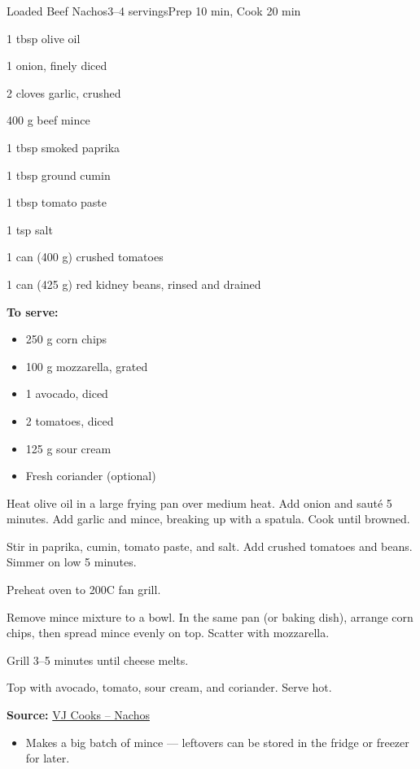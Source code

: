\newpage
\begin{recipebox}{Loaded Beef Nachos}{3--4 servings}{Prep 10 min, Cook 20 min}
\begin{ingredients}
  \item 1 tbsp olive oil
  \item 1 onion, finely diced
  \item 2 cloves garlic, crushed
  \item 400 g beef mince
  \item 1 tbsp smoked paprika
  \item 1 tbsp ground cumin
  \item 1 tbsp tomato paste
  \item 1 tsp salt
  \item 1 can (400 g) crushed tomatoes
  \item 1 can (425 g) red kidney beans, rinsed and drained
  \item \textbf{To serve:}
  \begin{itemize}
    \item 250 g corn chips
    \item 100 g mozzarella, grated
    \item 1 avocado, diced
    \item 2 tomatoes, diced
    \item 125 g sour cream
    \item Fresh coriander (optional)
  \end{itemize}
\end{ingredients}

\begin{method}
  \item Heat olive oil in a large frying pan over medium heat. Add onion and sauté 5 minutes. Add garlic and mince, breaking up with a spatula. Cook until browned.
  \item Stir in paprika, cumin, tomato paste, and salt. Add crushed tomatoes and beans. Simmer on low 5 minutes.
  \item Preheat oven to 200\degree C fan grill.
  \item Remove mince mixture to a bowl. In the same pan (or baking dish), arrange corn chips, then spread mince evenly on top. Scatter with mozzarella.
  \item Grill 3--5 minutes until cheese melts.
  \item Top with avocado, tomato, sour cream, and coriander. Serve hot.
\end{method}

\textbf{Source:} \href{https://vjcooks.com/loaded-beef-nachos/#mv-creation-578-jtr}{VJ Cooks – Nachos}

\begin{notes}
\begin{itemize}
  \item Makes a big batch of mince — leftovers can be stored in the fridge or freezer for later.
\end{itemize}
\end{notes}
\end{recipebox}

